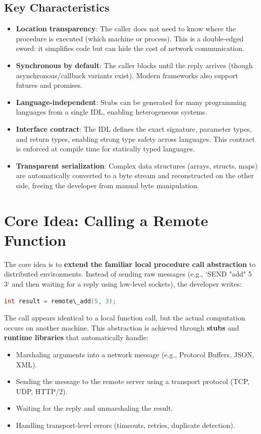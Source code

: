 \documentclass[10pt,a4paper]{article}
\begin{document}
\subsection{Key Characteristics}
\begin{itemize}
    \item \textbf{Location transparency}: The caller does not need to know where the procedure is executed (which machine or process). This is a double-edged sword: it simplifies code but can hide the cost of network communication.
    \item \textbf{Synchronous by default}: The caller blocks until the reply arrives (though asynchronous/callback variants exist). Modern frameworks also support futures and promises.
    \item \textbf{Language-independent}: Stubs can be generated for many programming languages from a single IDL, enabling heterogeneous systems.
    \item \textbf{Interface contract}: The IDL defines the exact signature, parameter types, and return types, enabling strong type safety across languages. This contract is enforced at compile time for statically typed languages.
    \item \textbf{Transparent serialization}: Complex data structures (arrays, structs, maps) are automatically converted to a byte stream and reconstructed on the other side, freeing the developer from manual byte manipulation.
\end{itemize}

\section{Core Idea: Calling a Remote Function}
The core idea is to \textbf{extend the familiar local procedure call abstraction} to distributed environments. 
Instead of sending raw messages (e.g., `SEND "add" 5 3` and then waiting for a reply using low-level sockets), the developer writes:

\begin{lstlisting}[language=C]
int result = remote\_add(5, 3);
\end{lstlisting}

The call appears identical to a local function call, but the actual computation occurs on another machine. 
This abstraction is achieved through \textbf{stubs} and \textbf{runtime libraries} that automatically handle:
\begin{itemize}
    \item Marshaling arguments into a network message (e.g., Protocol Buffers, JSON, XML).
    \item Sending the message to the remote server using a transport protocol (TCP, UDP, HTTP/2).
    \item Waiting for the reply and unmarshaling the result.
    \item Handling transport-level errors (timeouts, retries, duplicate detection).
\end{itemize}
\end{document}
